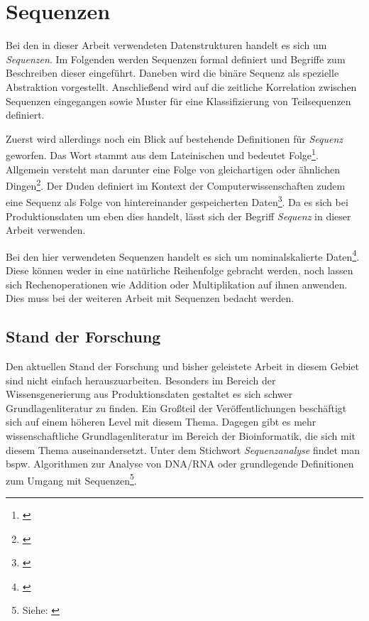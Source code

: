 \theoremstyle{definition}
\newtheorem{theorem}{Beispiel}[section]

\chapter{Sequenzen}
\label{chp:sequences}
Bei den in dieser Arbeit verwendeten Datenstrukturen handelt es sich um \textit{Sequenzen}. Im Folgenden werden Sequenzen formal definiert und Begriffe zum Beschreiben dieser eingeführt. Daneben wird die binäre Sequenz als spezielle Abstraktion vorgestellt. Anschließend wird auf die zeitliche Korrelation zwischen Sequenzen eingegangen sowie Muster für eine Klassifizierung von Teilsequenzen definiert.

Zuerst wird allerdings noch ein Blick auf bestehende Definitionen für \textit{Sequenz} geworfen. Das Wort stammt aus dem Lateinischen und bedeutet Folge\footnote{ \cite{SequenzDuden}}. Allgemein versteht man darunter eine Folge von gleichartigen oder ähnlichen Dingen\footnote{ \cite{SequenzWiktionary}}. Der Duden definiert im Kontext der Computerwissenschaften zudem eine Sequenz als Folge von hintereinander gespeicherten Daten\footnote{ \cite{SequenzDuden}}. Da es sich bei Produktionsdaten um eben dies handelt, lässt sich der Begriff \textit{Sequenz} in dieser Arbeit verwenden. 

Bei den hier verwendeten Sequenzen handelt es sich um nominalskalierte Daten\footnote{ \cite{Stevens1946}}. Diese können weder in eine natürliche Reihenfolge gebracht werden, noch lassen sich Rechenoperationen wie Addition oder Multiplikation auf ihnen anwenden. Dies muss bei der weiteren Arbeit mit Sequenzen bedacht werden.

\section{Stand der Forschung}
\label{chp:state-of-research-sequences}
Den aktuellen Stand der Forschung und bisher geleistete Arbeit in diesem Gebiet sind nicht einfach herauszuarbeiten. Besonders im Bereich der Wissensgenerierung aus Produktionsdaten gestaltet es sich schwer Grundlagenliteratur zu finden. Ein Großteil der Veröffentlichungen beschäftigt sich auf einem höheren Level mit diesem Thema. Dagegen gibt es mehr wissenschaftliche Grundlagenliteratur im Bereich der Bioinformatik, die sich mit diesem Thema auseinandersetzt. Unter dem Stichwort \textit{Sequenzanalyse} findet man bspw. Algorithmen zur Analyse von DNA/RNA oder grundlegende Definitionen zum Umgang mit Sequenzen\footnote{ Siehe: \cite{Algoseq2014}}.

